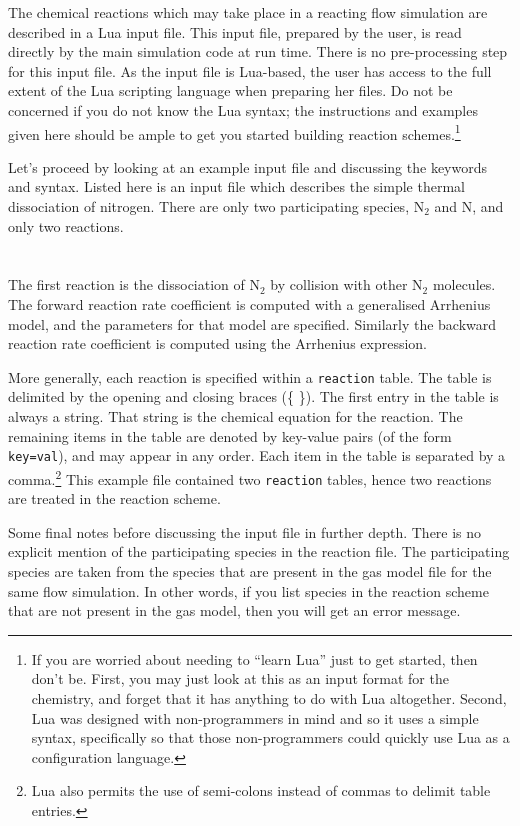 The chemical reactions which may take place in a reacting flow
simulation are described in a Lua input file.
This input file, prepared by the user, is read directly by the
main simulation code at run time.
There is no pre-processing step for this input file.
As the input file is Lua-based, the user has access to the 
full extent of the Lua scripting language when
preparing her files.
Do not be concerned if you do not know the Lua syntax; the instructions
and examples given here should be ample to get you started building
reaction schemes.\footnote{If you are worried about needing to ``learn Lua'' just
to get started, then don't be.  First, you may just look at this as an input
format for the chemistry, and forget that it has anything to do with Lua altogether.
Second, Lua was designed with non-programmers in mind and so it uses a simple syntax, 
specifically so that those non-programmers could quickly use Lua
as a configuration language.}

Let's proceed by looking at an example input file and discussing
the keywords and syntax.
Listed here is an input file which describes the simple thermal
dissociation of nitrogen.
There are only two participating species, N$_2$ and N, and
only two reactions.\\
\topbar\\

\bottombar\\
The first reaction is the dissociation of N$_2$ by collision with other
N$_2$ molecules.
The forward reaction rate coefficient is computed with a generalised
Arrhenius model, and the parameters for that model are specified.
Similarly the backward reaction rate coefficient is computed using
the Arrhenius expression.

More generally, each reaction is specified within a \texttt{reaction} table.
The table is delimited by the opening and closing braces (\{ \}).
The first entry in the table is always a string.
That string is the chemical equation for the reaction.
The remaining items in the table are denoted by key-value pairs (of the form \texttt{key=val}),  and may appear
in any order.
Each item in the table is separated by a comma.\footnote{Lua also permits the use
of semi-colons instead of commas to delimit table entries.}
This example file contained two \texttt{reaction} tables, hence two reactions
are treated in the reaction scheme.

Some final notes before discussing the input file in further depth.
There is no explicit mention of the participating species in the reaction file.
The participating species are taken from the species that are present in
the gas model file for the same flow simulation.
In other words, if you list species in the reaction scheme that are not
present in the gas model, then you will get an error message.


